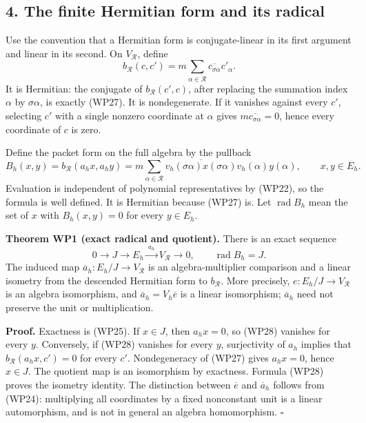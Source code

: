 \documentclass[
  10pt,
  a4paper,
]{article}
\begin{document}
\subsection{4. The finite Hermitian form and its
radical}\label{the-finite-hermitian-form-and-its-radical}

Use the convention that a Hermitian form is conjugate-linear in its
first argument and linear in its second. On \(V_{\mathcal R}\), define
\[
b_{\mathcal R}(c,c')=m\sum_{\alpha\in\mathcal R}
\overline{c_{\sigma\alpha}}c'_\alpha.
\tag{WP27}
\] It is Hermitian: the conjugate of \(b_{\mathcal R}(c',c)\), after
replacing the summation index \(\alpha\) by \(\sigma\alpha\), is exactly
(WP27). It is nondegenerate. If it vanishes against every \(c'\),
selecting \(c'\) with a single nonzero coordinate at \(\alpha\) gives
\(m\overline{c_{\sigma\alpha}}=0\), hence every coordinate of \(c\) is
zero.

Define the packet form on the full algebra by the pullback \[
B_h(x,y)=b_{\mathcal R}(a_hx,a_hy)
=m\sum_{\alpha\in\mathcal R}
\overline{v_h(\sigma\alpha)x(\sigma\alpha)}
v_h(\alpha)y(\alpha),
\qquad x,y\in E_h.
\tag{WP28}
\] Evaluation is independent of polynomial representatives by (WP22), so
the formula is well defined. It is Hermitian because (WP27) is. Let
\(\operatorname{rad}B_h\) mean the set of \(x\) with \(B_h(x,y)=0\) for
every \(y\in E_h\).

\textbf{Theorem WP1 (exact radical and quotient).} There is an exact
sequence \[
0\longrightarrow J\longrightarrow E_h
\xrightarrow{\ a_h\ }V_{\mathcal R}\longrightarrow0,
\qquad \operatorname{rad}B_h=J.
\tag{WP29}
\] The induced map \(\overline a_h:E_h/J\to V_{\mathcal R}\) is an
algebra-multiplier comparison and a linear isometry from the descended
Hermitian form to \(b_{\mathcal R}\). More precisely,
\(e:E_h/J\to V_{\mathcal R}\) is an algebra isomorphism, and
\(\overline a_h=V_h\overline e\) is a linear isomorphism;
\(\overline a_h\) need not preserve the unit or multiplication.

\textbf{Proof.} Exactness is (WP25). If \(x\in J\), then \(a_hx=0\), so
(WP28) vanishes for every \(y\). Conversely, if (WP28) vanishes for
every \(y\), surjectivity of \(a_h\) implies that
\(b_{\mathcal R}(a_hx,c')=0\) for every \(c'\). Nondegeneracy of (WP27)
gives \(a_hx=0\), hence \(x\in J\). The quotient map is an isomorphism
by exactness. Formula (WP28) proves the isometry identity. The
distinction between \(\overline e\) and \(\overline a_h\) follows from
(WP24): multiplying all coordinates by a fixed nonconstant unit is a
linear automorphism, and is not in general an algebra homomorphism.
\(\square\)
\end{document}
